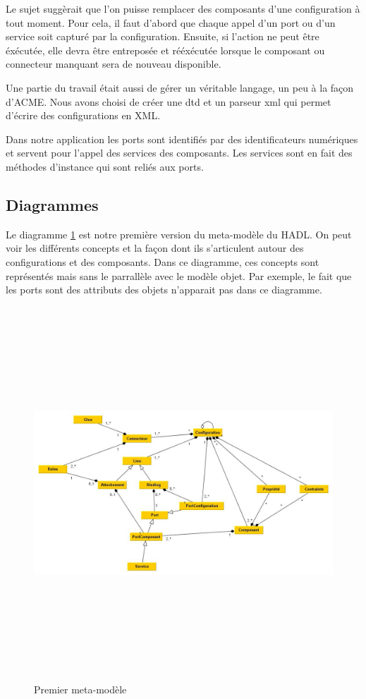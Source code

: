 \documentclass[11pt,a4paper]{article}
\begin{document}
Le sujet suggèrait que l'on puisse remplacer des composants d'une configuration à
tout moment. Pour cela, il faut d'abord que chaque appel d'un port ou d'un
service soit capturé par la configuration. Ensuite, si l'action ne peut être
éxécutée, elle devra être entreposée et rééxécutée lorsque le composant ou
connecteur manquant sera de nouveau disponible.

Une partie du travail était aussi de gérer un véritable langage, un peu à la
façon d'ACME. Nous avons choisi de créer une dtd et un parseur xml qui permet
d'écrire des configurations en XML.

Dans notre application les ports sont identifiés par des identificateurs
numériques et servent pour l'appel des services des composants. Les services
sont en fait des méthodes d'instance qui sont reliés aux ports.


\subsection{Diagrammes}

Le diagramme \ref{Premier meta-modèle} est notre première version du meta-modèle
du HADL. On peut voir les différents concepts et la façon dont ils s'articulent
autour des configurations et des composants. Dans ce diagramme, ces concepts
sont représentés mais sans le parrallèle avec le modèle objet. Par exemple, le
fait que les ports sont des attributs des objets n'apparait pas dans ce
diagramme.


\begin{figure}[h]
  		\centering
  		\includegraphics[height=14cm,width=15cm]{M2.jpg}
  		\caption{Premier meta-modèle}
  		\label{Premier meta-modèle}
\end{figure}
\end{document}

